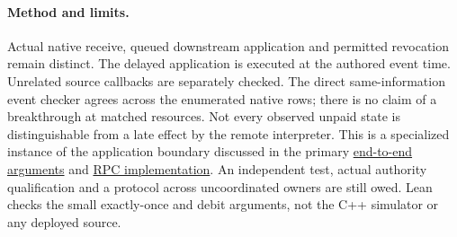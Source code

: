 \documentclass[11pt]{article}
\begin{document}
\paragraph{Method and limits.}
Actual native receive, queued downstream application and permitted
revocation remain distinct. The delayed application is executed
at the authored event time. Unrelated source callbacks are separately
checked. The direct same-information event checker agrees across
the enumerated native rows; there is no claim of a breakthrough at
matched resources. Not every observed unpaid state is distinguishable
from a late effect by the remote interpreter. This is a specialized
instance of the application boundary discussed in the primary
\href{https://pages.cs.wisc.edu/~pb/740/end-to-end.pdf}
{end-to-end arguments} and
\href{https://birrell.org/andrew/papers/ImplementingRPC.pdf}
{RPC implementation}. An independent test, actual authority
qualification and a protocol across uncoordinated owners are
still owed. Lean checks the small exactly-once and debit arguments,
not the C++ simulator or any deployed source.
\end{document}
